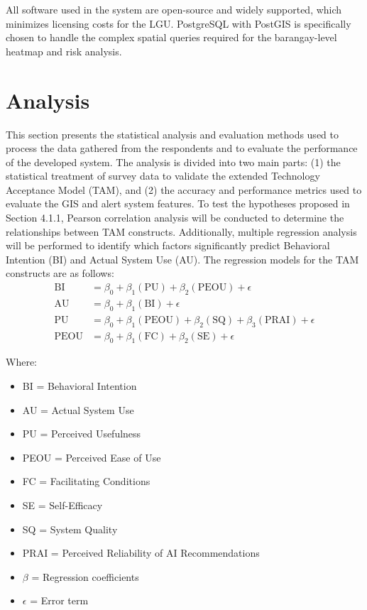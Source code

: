 \documentclass[12pt, a4paper]{report}
\begin{document}
All software used in the system are open-source and widely supported, which minimizes licensing costs for the LGU. PostgreSQL with PostGIS is specifically chosen to handle the complex spatial queries required for the barangay-level heatmap and risk analysis.

\section{Analysis}
\label{sec:analysis}
This section presents the statistical analysis and evaluation methods used to process the data gathered from the respondents and to evaluate the performance of the developed system. The analysis is divided into two main parts: (1) the statistical treatment of survey data to validate the extended Technology Acceptance Model (TAM), and (2) the accuracy and performance metrics used to evaluate the GIS and alert system features.
To test the hypotheses proposed in Section 4.1.1, Pearson correlation analysis will be conducted to determine the relationships between TAM constructs. Additionally, multiple regression analysis will be performed to identify which factors significantly predict Behavioral Intention (BI) and Actual System Use (AU).
The regression models for the TAM constructs are as follows:
\begin{align}
    \text{BI} &= \beta_0 + \beta_1(\text{PU}) + \beta_2(\text{PEOU}) + \epsilon \\
    \text{AU} &= \beta_0 + \beta_1(\text{BI}) + \epsilon \\
    \text{PU} &= \beta_0 + \beta_1(\text{PEOU}) + \beta_2(\text{SQ}) + \beta_3(\text{PRAI}) + \epsilon \\
    \text{PEOU} &= \beta_0 + \beta_1(\text{FC}) + \beta_2(\text{SE}) + \epsilon
\end{align}

Where:
\begin{itemize}
    \item BI = Behavioral Intention
    \item AU = Actual System Use
    \item PU = Perceived Usefulness
    \item PEOU = Perceived Ease of Use
    \item FC = Facilitating Conditions
    \item SE = Self-Efficacy
    \item SQ = System Quality
    \item PRAI = Perceived Reliability of AI Recommendations
    \item \(\beta\) = Regression coefficients
    \item \(\epsilon\) = Error term
\end{itemize}
\end{document}
